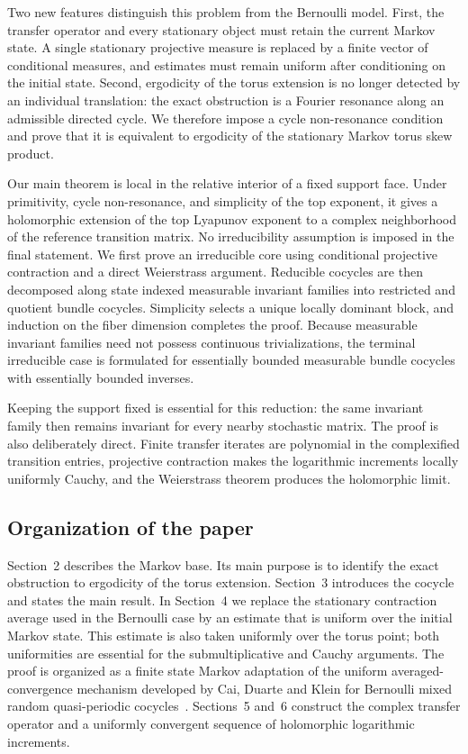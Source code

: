\documentclass[11pt,a4paper]{amsart}
\begin{document}
Two new features distinguish this problem from the Bernoulli model.
First, the transfer operator and every stationary object must retain
the current Markov state.  A single stationary projective measure is
replaced by a finite vector of conditional measures, and estimates
must remain uniform after conditioning on the initial state.  Second,
ergodicity of the torus extension is no longer detected by an
individual translation: the exact obstruction is a Fourier resonance
along an admissible directed cycle.  We therefore impose a cycle
non-resonance condition and prove that it is equivalent to ergodicity
of the stationary Markov torus skew product.

Our main theorem is local in the relative interior of a fixed support
face.  Under primitivity, cycle non-resonance, and simplicity of the
top exponent, it gives a holomorphic extension of the top Lyapunov
exponent to a complex neighborhood of the reference transition
matrix.  No irreducibility assumption is imposed in the final
statement.  We first prove an irreducible core using conditional
projective contraction and a direct Weierstrass argument.  Reducible
cocycles are then decomposed along state indexed measurable invariant
families into restricted and quotient bundle cocycles.  Simplicity
selects a unique locally dominant block, and induction on the fiber
dimension completes the proof.  Because measurable invariant families
need not possess continuous trivializations, the terminal irreducible
case is formulated for essentially bounded measurable bundle
cocycles with essentially bounded inverses.

Keeping the support fixed is essential for this reduction: the same
invariant family then remains invariant for every nearby stochastic
matrix. The proof is also deliberately direct. 
Finite transfer iterates are polynomial in the complexified transition entries,
projective contraction makes the logarithmic increments locally
uniformly Cauchy, and the Weierstrass theorem produces the holomorphic
limit.

\subsection*{Organization of the paper}

Section~2 describes the Markov base.  Its main purpose is
to identify the exact obstruction to ergodicity of the torus
extension. 
Section~3 introduces the cocycle and states the main result.  In Section~4 we replace the stationary contraction average used in the Bernoulli case by an estimate that is uniform over the initial Markov state.  This estimate is also taken uniformly over the torus point; both uniformities are essential for the submultiplicative and Cauchy
arguments.  The proof is organized as a finite state Markov adaptation
of the uniform averaged-convergence mechanism developed by
Cai, Duarte and Klein for Bernoulli mixed random quasi-periodic
cocycles~\cite{CDK}.
Sections~5 and~6 construct the complex transfer operator and a
uniformly convergent sequence of holomorphic logarithmic increments.
  
\end{document}
